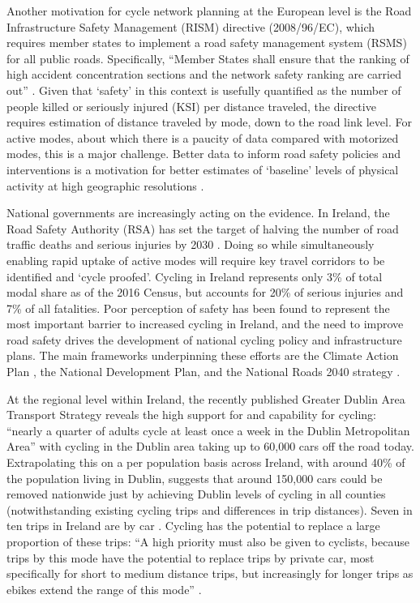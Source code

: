 \documentclass[
  super,
  preprint,
  3p]{elsarticle}
\begin{document}
Another motivation for cycle network planning at the European level is
the Road Infrastructure Safety Management (RISM) directive (2008/96/EC),
which requires member states to implement a road safety management
system (RSMS) for all public roads. Specifically, ``Member States shall
ensure that the ranking of high accident concentration sections and the
network safety ranking are carried out'' \citep{directiv2008}. Given
that `safety' in this context is usefully quantified as the number of
people killed or seriously injured (KSI) per distance traveled, the
directive requires estimation of distance traveled by mode, down to the
road link level. For active modes, about which there is a paucity of
data compared with motorized modes, this is a major challenge. Better
data to inform road safety policies and interventions is a motivation
for better estimates of `baseline' levels of physical activity at high
geographic resolutions \citep{tait2023}.

National governments are increasingly acting on the evidence. In
Ireland, the Road Safety Authority (RSA) has set the target of halving
the number of road traffic deaths and serious injuries by 2030
\citep{national2021}. Doing so while simultaneously enabling rapid
uptake of active modes will require key travel corridors to be
identified and `cycle proofed'. Cycling in Ireland represents only 3\%
of total modal share as of the 2016 Census, but accounts for 20\% of
serious injuries and 7\% of all fatalities. Poor perception of safety
has been found to represent the most important barrier to increased
cycling in Ireland\citep{brick2018}, and the need to improve road safety
drives the development of national cycling policy and infrastructure
plans. The main frameworks underpinning these efforts are the Climate
Action Plan \citep{climate2022a}, the National Development Plan, and the
National Roads 2040 strategy \citep{national2023}.

At the regional level within Ireland, the recently published Greater
Dublin Area Transport Strategy \citep{greater} reveals the high support
for and capability for cycling: ``nearly a quarter of adults cycle at
least once a week in the Dublin Metropolitan Area'' with cycling in the
Dublin area taking up to 60,000 cars off the road today. Extrapolating
this on a per population basis across Ireland, with around 40\% of the
population living in Dublin, suggests that around 150,000 cars could be
removed nationwide just by achieving Dublin levels of cycling in all
counties (notwithstanding existing cycling trips and differences in trip
distances). Seven in ten trips in Ireland are by car \citep{national}.
Cycling has the potential to replace a large proportion of these trips:
``A high priority must also be given to cyclists, because trips by this
mode have the potential to replace trips by private car, most
specifically for short to medium distance trips, but increasingly for
longer trips as ebikes extend the range of this mode'' \citep{greater}.
\end{document}

